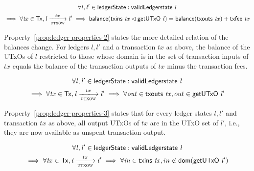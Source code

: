 \begin{property}
  \begin{multline*}
    \forall \var{l}, \var{l'} \in \ledgerState: \applyFun{validLedgerstate}{l}\\
    \implies \forall \var{tx} \in \Tx, \var{l} \trans{utxow}{tx} \var{l'}
    \implies \fun{balance}(\applyFun{txins}{tx} \restrictdom
    \applyFun{getUTxO}{l}) = \fun{balance}(\applyFun{txouts}{tx}) +
    \applyFun{txfee}{tx}
  \end{multline*}
  \label{prop:ledger-properties-2}
\end{property}

Property~\ref{prop:ledger-properties-2} states the more detailed relation of the
balances change. For ledgers $l, l'$ and a transaction $tx$ as above, the
balance of the UTxOs of $l$ restricted to those whose domain is in the set of
transaction inputs of $tx$ equals the balance of the transaction outputs of $tx$
minus the transaction fees.

\begin{property}
  \begin{multline*}
    \forall \var{l}, \var{l'} \in \ledgerState: \applyFun{validLedgerstate}{l}\\
    \implies \forall \var{tx} \in \Tx, \var{l} \trans{utxow}{tx} \var{l'}
    \implies \forall \var{out} \in \applyFun{txouts}{tx}, out \in
    \applyFun{getUTxO}{l'}
  \end{multline*}
  \label{prop:ledger-properties-3}
\end{property}

Property~\ref{prop:ledger-properties-3} states that for every ledger states
$l, l'$ and transaction $tx$ as above, all output UTxOs of $tx$ are in the UTxO
set of $l'$, i.e., they are now available as unspent transaction output.

\begin{property}
  \begin{multline*}
    \forall \var{l}, \var{l'} \in \ledgerState: \applyFun{validLedgerstate}{l}\\
    \implies \forall \var{tx} \in \Tx, \var{l} \trans{utxow}{tx} \var{l'}
    \implies \forall \var{in} \in \applyFun{txins}{tx}, in \not\in
    \fun{dom}(\applyFun{getUTxO}{l'})
  \end{multline*}
  \label{prop:ledger-properties-4}
\end{property}

